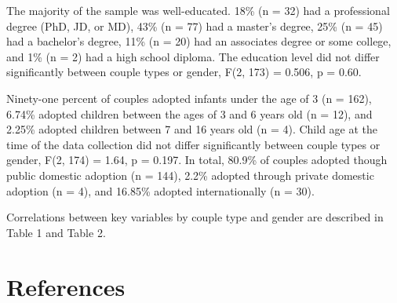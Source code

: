 \documentclass[man]{apa6}
\begin{document}
The majority of the sample was well-educated. 18\% (n = 32) had a professional degree (PhD, JD, or MD), 43\% (n = 77) had a master's degree, 25\% (n = 45) had a bachelor's degree, 11\% (n = 20) had an associates degree or some college, and 1\% (n = 2) had a high school diploma. The education level did not differ significantly between couple types or gender, F(2, 173) = 0.506, p = 0.60.

Ninety-one percent of couples adopted infants under the age of 3 (n = 162), 6.74\% adopted children between the ages of 3 and 6 years old (n = 12), and 2.25\% adopted children between 7 and 16 years old (n = 4). Child age at the time of the data collection did not differ significantly between couple types or gender, F(2, 174) = 1.64, p = 0.197. In total, 80.9\% of couples adopted though public domestic adoption (n = 144), 2.2\% adopted through private domestic adoption (n = 4), and 16.85\% adopted internationally (n = 30).

Correlations between key variables by couple type and gender are described in Table 1 and Table 2.

\newpage

\hypertarget{references}{%
\section{References}\label{references}}

\begingroup
\setlength{\parindent}{-0.5in}
\setlength{\leftskip}{0.5in}

\hypertarget{refs}{}

\endgroup
\end{document}
